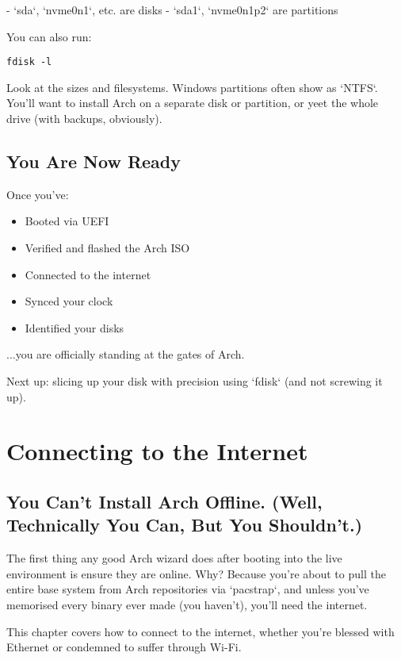 \documentclass[12pt]{book}
\begin{document}
- `sda`, `nvme0n1`, etc. are disks
- `sda1`, `nvme0n1p2` are partitions

You can also run:
\begin{lstlisting}
fdisk -l
\end{lstlisting}

Look at the sizes and filesystems. Windows partitions often show as `NTFS`. You’ll want to install Arch on a separate disk or partition, or yeet the whole drive (with backups, obviously).

\section*{You Are Now Ready}

Once you’ve:

\begin{itemize}
  \item Booted via UEFI
  \item Verified and flashed the Arch ISO
  \item Connected to the internet
  \item Synced your clock
  \item Identified your disks
\end{itemize}

...you are officially standing at the gates of Arch.

Next up: slicing up your disk with precision using `fdisk` (and not screwing it up).

\clearpage


\chapter{Connecting to the Internet}

\section*{You Can’t Install Arch Offline. (Well, Technically You Can, But You Shouldn’t.)}

The first thing any good Arch wizard does after booting into the live environment is ensure they are online. Why? Because you’re about to pull the entire base system from Arch repositories via `pacstrap`, and unless you've memorised every binary ever made (you haven't), you’ll need the internet.

This chapter covers how to connect to the internet, whether you’re blessed with Ethernet or condemned to suffer through Wi-Fi.
\end{document}
